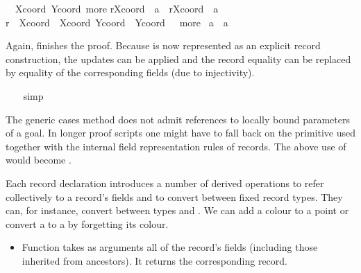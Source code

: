 \begin{isabellebody}
\begin{isamarkuptxt}
\begin{isabelle}
\ {}{\isachardot}\ {\isasymAnd}Xcoord\ Ycoord\ more{\isachardot}\isanewline
{}r{\isasymlparr}Xcoord\ {\isacharcolon}{\isacharequal}\ a{\isasymrparr}\ {\isacharequal}\ r{\isasymlparr}Xcoord\ {\isacharcolon}{\isacharequal}\ a{\isacharprime}{\isasymrparr}{\isacharsemicolon}\isanewline
{}r\ {\isacharequal}\ {\isasymlparr}Xcoord\ {\isacharequal}\ Xcoord{\isacharcomma}\ Ycoord\ {\isacharequal}\ Ycoord{\isacharcomma}\ {\isasymdots}\ {\isacharequal}\ more{\isasymrparr}{\isasymrbrakk}\isanewline
{}\ a\ {\isacharequal}\ a{\isacharprime}%
\end{isabelle} Again,  finishes the proof.  Because  is now represented as
  an explicit record construction, the updates can be applied and the
  record equality can be replaced by equality of the corresponding
  fields (due to injectivity).%
\end{isamarkuptxt}%
\isamarkuptrue%
\ \ \isamarkupfalse%
\ simp\isanewline
\ \ \isamarkupfalse%
%
\endisatagproof
{\isafoldproof}%
%
\isadelimproof
%
\endisadelimproof
%
\begin{isamarkuptext}%
The generic cases method does not admit references to locally bound
  parameters of a goal.  In longer proof scripts one might have to
  fall back on the primitive  used together with the
  internal field representation rules of records.  The above use of
   would become .%
\end{isamarkuptext}%
\isamarkuptrue%
%
\isamarkuptrue%
%
\begin{isamarkuptext}%
Each record declaration introduces a number of derived operations to
  refer collectively to a record's fields and to convert between fixed
  record types.  They can, for instance, convert between types  and .  We can add a colour to a point or convert
  a  to a  by forgetting its colour.

  \begin{itemize}

  \item Function  takes as arguments all of the record's
  fields (including those inherited from ancestors).  It returns the
  corresponding record.


\end{itemize}
\end{isamarkuptext}
\end{isabellebody}
